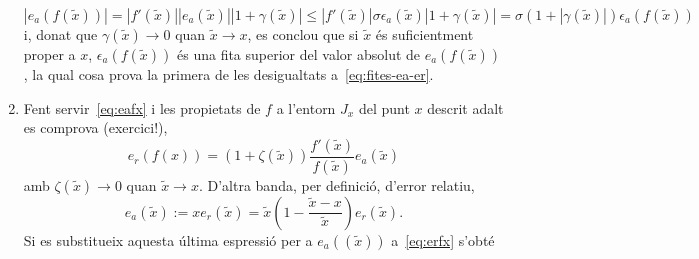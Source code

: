 \documentclass[a4paper,twoside,12pt]{exam}
\begin{document}
\begin{questions}
\begin{solution}
\begin{enumerate}[label=(\roman*), ref=(\roman*)]
\begin{displaymath}
  \left|e_{a}\left(f\left(\tilde{x}\right)\right)\right| = 
  \left|f'\left(\tilde{x}\right)\right|
  \left|e_{a}\left(\tilde{x}\right)
  \right|\left| 1 + \gamma\left(\tilde{x}\right)\right|\le
  \left|f'\left(\tilde{x}\right)\right|
  \sigma\epsilon_{a}\left(\tilde{x}\right)
  \left| 1 + \gamma\left(\tilde{x}\right)\right| 
  = \sigma\left(1 + \left|\gamma\left(\tilde{x}\right)\right|\right)
  \epsilon_{a}\left(f\left(\tilde{x}\right)\right)
\end{displaymath}
i, donat que $\gamma\left(\tilde{x}\right)\to 0$ quan $\tilde{x}\to x$, 
es conclou que si $\tilde{x}$ és suficientment proper a $x$,
$\epsilon_{a}\left(f\left(\tilde{x}\right)\right)$ és una fita 
superior del valor absolut de $e_{a}\left(f\left(\tilde{x}\right)\right)$,
la qual cosa prova la primera de les desigualtats a~\eqref{eq:fites-ea-er}.
%
\item Fent servir~\eqref{eq:eafx} i les propietats de $f$ a l'entorn 
$J_{x}$ del punt $x$ descrit adalt es comprova (exercici!),
\begin{equation}\label{eq:erfx}
  e_{r}\left(f\left(x\right)\right) = \left(1 +
    \zeta\left(\tilde{x}\right)\right)
    \frac{f'\left(\tilde{x}\right)}{f\left(\tilde{x}\right)}e_{a}
    \left(\tilde{x}\right)
\end{equation}
amb $\zeta\left(\tilde{x}\right)\to 0$ quan $\tilde{x}\to x$.
D'altra banda, per definició, d'error relatiu,
\begin{displaymath}
    e_{a}\left(\tilde{x}\right) := xe_{r}\left(\tilde{x}\right) =
    \tilde{x}\left(1 -
    \frac{\tilde{x}-x}{\tilde{x}}\right)e_{r}\left(\tilde{x}\right).
\end{displaymath}
Si es substitueix aquesta última espressió per a
$e_{a}\left(\left(\tilde{x}\right)\right)$ a~\eqref{eq:erfx} s'obté
\begin{equation}\label{eq:erfx-1}

\end{equation}
\end{enumerate}
\end{solution}
\end{questions}
\end{document}
